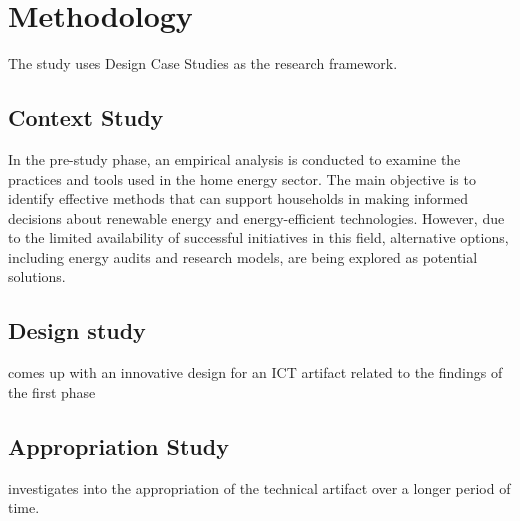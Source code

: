 \chapter{Methodology} 

The study uses Design Case Studies \cite{dcs} as the research framework. 


\section{Context Study}

In the pre-study phase, 
an empirical analysis is conducted to examine the practices and tools used in the home energy sector. 
The main objective is to identify effective methods that can support households in making informed decisions about renewable energy and energy-efficient technologies. 
However, due to the limited availability of successful initiatives in this field, alternative options, including energy audits and research models, are being explored as potential solutions. 


\section{Design study}

comes up with an innovative design for an ICT artifact related to the findings of the first phase


\section{Appropriation Study}

investigates into the appropriation of the technical artifact over a longer period of time. 

